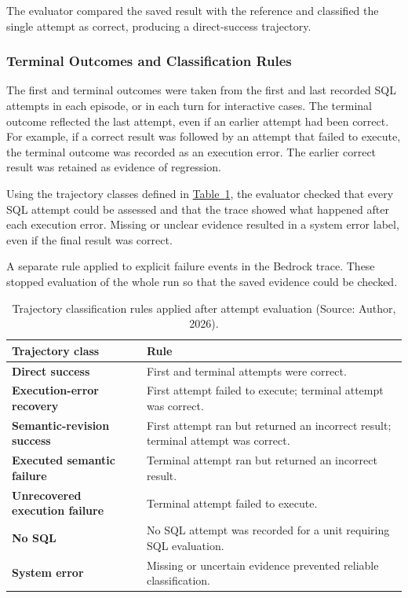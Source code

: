 The evaluator compared the saved result with the reference and classified
the single attempt as correct, producing a direct-success trajectory.

\subsubsection{Terminal Outcomes and Classification Rules}

The first and terminal outcomes were taken from the first and last recorded
SQL attempts in each episode, or in each turn for interactive cases.
The terminal outcome reflected the last attempt, even if an earlier attempt
had been correct. For example, if a correct result was followed by an
attempt that failed to execute, the terminal outcome was recorded as an
execution error. The earlier correct result was retained as evidence
of regression.

Using the trajectory classes defined in \hyperref[tab:trajectory-classes]{Table~\ref*{tab:trajectory-classes}}, 
the evaluator checked that every SQL attempt could be assessed and that
the trace showed what happened after each execution error.
Missing or unclear evidence resulted in a system error label,
even if the final result was correct.

A separate rule applied to explicit failure events in the Bedrock trace.
These stopped evaluation of the whole run so that the saved evidence
could be checked.
\begin{table}[H]
\centering
{\small
\begin{tabularx}{\textwidth}{@{}>{\raggedright\arraybackslash\bfseries}p{}>{\raggedright\arraybackslash}X@{}}
\toprule
Trajectory class & \textbf{Rule} \\
\midrule
Direct success & First and terminal attempts were correct. \\
\addlinespace[0.6em]
Execution-error recovery & First attempt failed to execute; terminal attempt was correct. \\
\addlinespace[0.6em]
Semantic-revision success & First attempt ran but returned an incorrect result;
terminal attempt was correct. \\
\addlinespace[0.6em]
Executed semantic failure & Terminal attempt ran but returned an incorrect result. \\
\addlinespace[0.6em]
Unrecovered execution failure & Terminal attempt failed to execute. \\
\addlinespace[0.6em]
No SQL & No SQL attempt was recorded for a unit requiring SQL evaluation. \\
\addlinespace[0.6em]
System error & Missing or uncertain evidence prevented reliable classification. \\
\bottomrule
\end{tabularx}
}
\caption{Trajectory classification rules applied after attempt evaluation
(Source: Author, 2026).}
\label{tab:trajectory-classes}
\end{table}

